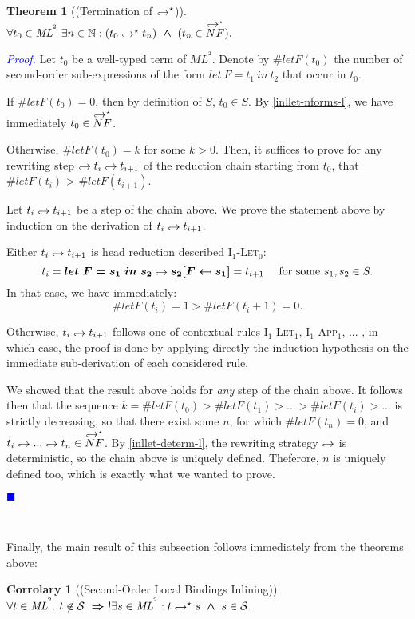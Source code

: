\documentclass[a4paper,11pt,oneside]{article}
\theoremstyle{plain}
\newtheorem{theorem}[definition]{Theorem}
\newtheorem{corr}[definition]{Corrolary}
\renewenvironment{proof}{\noindent \textcolor{blue}{\textit{Proof.}}}
{{\begin{tiny}\textcolor{blue}{$\blacksquare$}\end{tiny}}\\}
\newcommand{\tmlet}[3]{let~#1=#2~in~#3}
\newcommand{\tmsbst}[3]{#1 [#2 \mapsfrom #3] }
\newcommand{\bwedge}{\boldsymbol{~\wedge~}}
\newcommand{\brarr}{\boldsymbol{~\Rightarrow~}}
\newcommand{\inlS}{\mathcal{S}}
\newcommand{\inlsrc}{\textit{ML}^{^2}}
\newcommand{\inlT}{\inlsrc}
\newcommand{\hookdownarrow}{\mathrel{\rotatebox[origin=c]{180}{$\hookleftarrow$}}}
\newcommand{\inlletarr}{\hookdownarrow}
\newcommand{\inlletstar}{\hookdownarrow^{\star}}
\newcommand{\inlletplus}{\inlletstar}
\newcommand{\inlletNF}{\overset{\inlletplus}{NF}}
\newcommand{\inllett}[2]{#1 \inlletplus #2}
\begin{document}
\begin{theorem}[(Termination of $\inlletplus$)] 
		$\forall t_0 \in \inlsrc ~
	 			\exists n \in \mathbb{N}:  
	 				  (\inllett{t_0}{t_n}) \bwedge (t_n \in \inlletNF).$
\label{inllet-term-l}
\end{theorem}
\begin{proof} 
	Let $t_0$ be a well-typed term of $\inlsrc$.  Denote by $\#letF(t_0)$ the number of second-order sub-expressions of the form $\tmlet{F}{t_1}{t_2}$ that occur in $t_0$. 
 
	If $\#letF(t_0) = 0$, then by definition of $S$, $t_0 \in S$. By \cref{inllet-nforms-l}, we have immediately $t_0 \in \inlletNF$.
	
	Otherwise, $\#letF(t_0) = k$ for some $k > 0$.
	Then, it suffices to prove for any rewriting step $\inlletarr t_{i} \inlletarr  t_{i+1}$ of the reduction chain starting from $ t_0$, that $\#letF(t_{i})$ > $\#letF(t_{i+1})$. 
	
	
	Let $ t_i \inlletarr t_{i+1}$ be a step of the chain above. We prove the statement above by induction on the derivation of $ t_i \inlletarr t_{i+1}$.

	Either $ t_i \inlletarr t_{i+1}$ is head reduction described \textsc{I$_1$-Let$_0$}: 
	$$ t_i = \boldsymbol{\tmlet{F}{s_1}{s_2}} \inlletarr \boldsymbol{\tmsbst{s_2}{F}{s_1}} = t_{i+1} \quad \text{ for some } s_1, s_2  \in S.$$ 
	In that case, we have immediately: 
	$$ \#letF(t_i) = 1 > \#letF(t_i+1) = 0.$$
	
	Otherwise, $ t_i \inlletarr t_{i+1}$ follows one of contextual rules \textsc{I$_1$-Let$_1$}, \textsc{I$_1$-App$_1$}, ... , in which case, the proof is done by applying directly the induction hypothesis on the immediate sub-derivation	of each considered rule.
	
	We showed that the result above holds for \textit{any} step of the chain above. 
	It follows then that the sequence $k = \#letF(t_0) > \#letF(t_1) >  ... > \#letF(t_i) > ... $ is strictly decreasing, so that there exist some $n$, for which $\#letF(t_n) = 0$, and $ t_{i} \inlletarr ... \inlletarr t_n \in \inlletNF$. 
	By \cref{inllet-determ-l}, the rewriting strategy $\inlletarr$ is deterministic, so the chain above is uniquely defined.
	Theferore, $n$ is uniquely defined too, which is exactly what we wanted to prove. 
\end{proof}


Finally, the main result of this subsection follows immediately from the theorems above:
\begin{corr}[(Second-Order Local Bindings Inlining)] 
~\\
 $\forall t \in \inlT.~ t \not\in \inlS \brarr 
	 				  !\exists s \in \inlT: \inllett{t}{s} \bwedge s \in \inlS.$
\end{corr}
\end{document}
